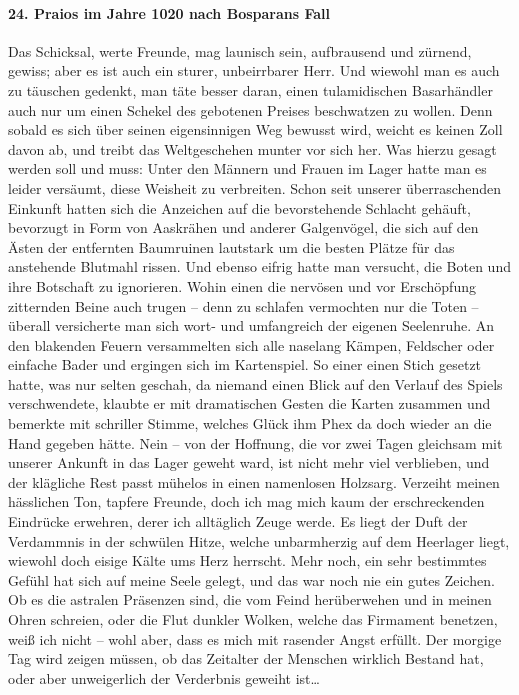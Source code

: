 \paragraph{24. Praios im Jahre 1020 nach Bosparans Fall}
Das Schicksal, werte Freunde, mag launisch sein, aufbrausend und zürnend, gewiss; aber es ist auch ein sturer, unbeirrbarer Herr. Und wiewohl man es auch zu täuschen gedenkt, man täte besser daran, einen tulamidischen Basarhändler auch nur um einen Schekel des gebotenen Preises beschwatzen zu wollen. Denn sobald es sich über seinen eigensinnigen Weg bewusst wird, weicht es keinen Zoll davon ab, und treibt das Weltgeschehen munter vor sich her. Was hierzu gesagt werden soll und muss: Unter den Männern und Frauen im Lager hatte man es leider versäumt, diese Weisheit zu verbreiten. Schon seit unserer überraschenden Einkunft hatten sich die Anzeichen auf die bevorstehende Schlacht gehäuft, bevorzugt in Form von Aaskrähen und anderer Galgenvögel, die sich auf den Ästen der entfernten Baumruinen lautstark um die besten Plätze für das anstehende Blutmahl rissen. Und ebenso eifrig hatte man versucht, die Boten und ihre Botschaft zu ignorieren. Wohin einen die nervösen und vor Erschöpfung zitternden Beine auch trugen -- denn zu schlafen vermochten nur die Toten -- überall versicherte man sich wort- und umfangreich der eigenen Seelenruhe. An den blakenden Feuern versammelten sich alle naselang Kämpen, Feldscher oder einfache Bader und ergingen sich im Kartenspiel. So einer einen Stich gesetzt hatte, was nur selten geschah, da niemand einen Blick auf den Verlauf des Spiels verschwendete, klaubte er mit dramatischen Gesten die Karten zusammen und bemerkte mit schriller Stimme, welches Glück ihm Phex da doch wieder an die Hand gegeben hätte. Nein -- von der Hoffnung, die vor zwei Tagen gleichsam mit unserer Ankunft in das Lager geweht ward, ist nicht mehr viel verblieben, und der klägliche Rest passt mühelos in einen namenlosen Holzsarg. Verzeiht meinen hässlichen Ton, tapfere Freunde, doch ich mag mich kaum der erschreckenden Eindrücke erwehren, derer ich alltäglich Zeuge werde. Es liegt der Duft der Verdammnis in der schwülen Hitze, welche unbarmherzig auf dem Heerlager liegt, wiewohl doch eisige Kälte ums Herz herrscht. Mehr noch, ein sehr bestimmtes Gefühl hat sich auf meine Seele gelegt, und das war noch nie ein gutes Zeichen. Ob es die astralen Präsenzen sind, die vom Feind herüberwehen und in meinen Ohren schreien, oder die Flut dunkler Wolken, welche das Firmament benetzen, weiß ich nicht -- wohl aber, dass es mich mit rasender Angst erfüllt. Der morgige Tag wird zeigen müssen, ob das Zeitalter der Menschen wirklich Bestand hat, oder aber unweigerlich der Verderbnis geweiht ist\dots

